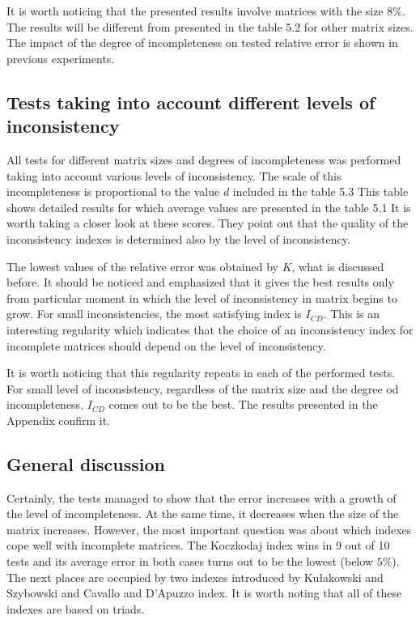 It is worth noticing that the presented results involve matrices with the size $8\%$. The results will be different from presented in the table 5.2 for other matrix sizes. The impact of the degree of incompleteness on tested relative error is shown in previous experiments.

\subsection{Tests taking into account different levels of inconsistency}
All tests for different matrix sizes and degrees of incompleteness was performed taking into account various levels of inconsistency. The scale of this incompleteness is proportional to the value $d$ included in the table 5.3 This table shows detailed results for which average values are presented in the table 5.1 It is worth taking a closer look at these scores. They point out that the quality of the inconsistency indexes is determined also by the level of inconsistency.

The lowest values of the relative error was obtained by $K$, what is discussed before. It should be noticed and emphasized that it gives the best results only from particular moment in which the level of inconsistency in matrix begins to grow. For small inconsistencies, the most satisfying index is $I_{CD}$. This is an interesting regularity which indicates that the choice of an inconsistency index for incomplete matrices should depend on the level of inconsistency. 

It is worth noticing that this regularity repeats in each of the performed tests. For small level of inconsistency, regardless of the matrix size and the degree od incompleteness, $I_{CD}$ comes out to be the best. The results presented in the Appendix confirm it.

\subsection{General discussion}
Certainly, the tests managed to show that the error increases with a growth of the level of incompleteness. At the same time, it decreases when the size of the matrix increases. However, the most important question was about which indexes cope well with incomplete matrices. The Koczkodaj index wins in 9 out of 10 tests and its average error in both cases turns out to be the lowest (below $5\%$). The next places are occupied by two indexes introduced by Kułakowski and Szybowski and Cavallo and D'Apuzzo index. It is worth noting that all of these indexes are based on triads.

